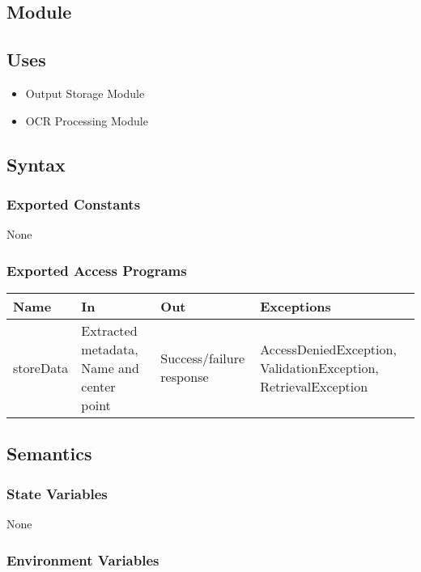 \documentclass[12pt, titlepage]{article}
\begin{document}
\subsection{Module}

\subsection{Uses}

\begin{itemize}
  \item Output Storage Module
  \item OCR Processing Module
\end{itemize}

\subsection{Syntax}

\subsubsection{Exported Constants}

None

\subsubsection{Exported Access Programs}

\begin{center}
\begin{tabular}{p{2cm} p{4cm} p{4cm} p{2cm}}
\hline
\textbf{Name} & \textbf{In} & \textbf{Out} & \textbf{Exceptions} \\
\hline
storeData & Extracted metadata, Name and center point & Success/failure response & AccessDeniedException, ValidationException, RetrievalException \\
\hline
\end{tabular}
\end{center}

\subsection{Semantics}

\subsubsection{State Variables}

None

\subsubsection{Environment Variables}
\end{document}
